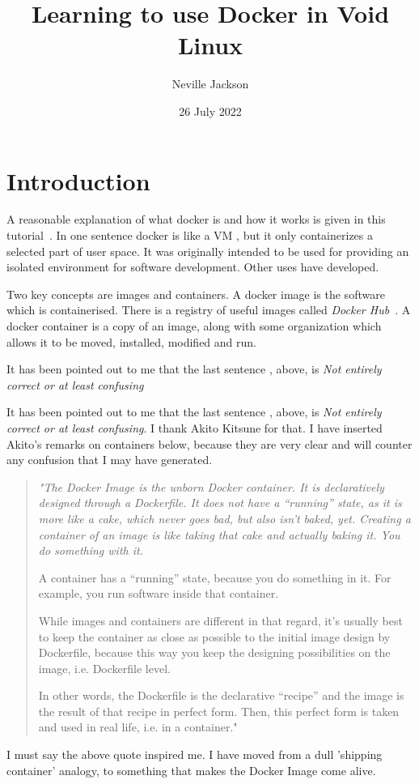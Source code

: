 \documentclass{article}  %
\title{Learning to use Docker in Void Linux}
\author{Neville Jackson}
\date{26 July 2022}
\begin{document}
 

\maketitle      

\section{Introduction} 
A reasonable explanation of what docker is and how it works is given in this tutorial~\cite{dock:00}. In one sentence docker is like a VM , but it only containerizes a selected part of user space. It was originally intended to be used for providing an isolated environment for software development. Other uses have developed. 

Two key concepts are images and containers. A docker image is the software which is containerised. There is a registry of useful images called {\em Docker Hub}~\cite{dock:02}. A docker container is  a copy of an image, along with some organization which  allows it to be moved, installed, modified and run.

It has been pointed out to me that the last sentence , above, is {\em Not entirely correct or at least confusing}

It has been pointed out to me that the last sentence , above, is {\em Not entirely correct or at least confusing}. I thank Akito Kitsune for that. I have inserted Akito's remarks on containers below, because they are very clear and will counter any confusion that I may have generated.
\begin{quotation}
\em "The Docker Image is the unborn Docker container. It is declaratively designed through a Dockerfile.
It does not have a “running” state, as it is more like a cake, which never goes bad, but also isn’t baked, yet.
Creating a container of an image is like taking that cake and actually baking it. You do something with it.

A container has a “running” state, because you do something in it. For example, you run software inside that container.

While images and containers are different in that regard, it’s usually best to keep the container as close as possible to the initial image design by Dockerfile, because this way you keep the designing possibilities on the image, i.e. Dockerfile level.

In other words, the Dockerfile is the declarative “recipe” and the image is the result of that recipe in perfect form.
Then, this perfect form is taken and used in real life, i.e. in a container."
\end{quotation}
I must say the above quote inspired me. I have moved from a dull 'shipping container' analogy, to something that makes the Docker Image come alive.
\end{document}
